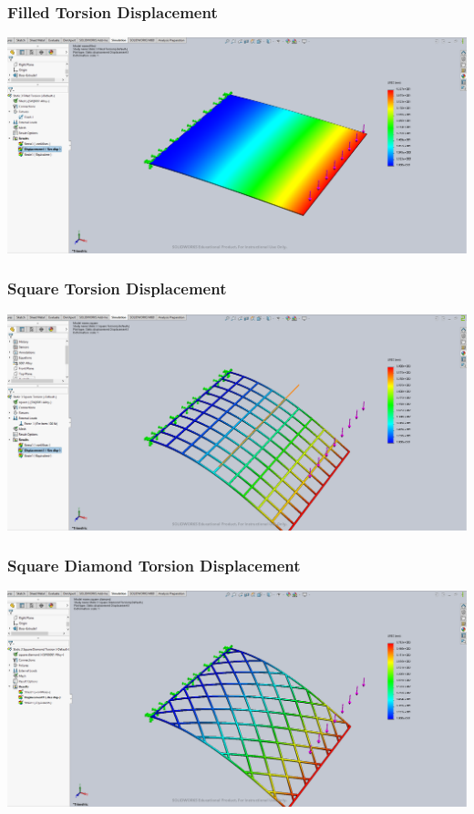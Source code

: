 \documentclass[12pt, letterpaper]{article}
\begin{document}
\begin{singlespace}
\subsubsection{Filled Torsion Displacement}
\label{ap:f-to-d}
\includegraphics[width=0.8\linewidth]{./graphs/torsion/filled-torsion-displacement}

\subsubsection{Square Torsion Displacement}
\label{ap:s-to-d}
\includegraphics[width=0.8\linewidth]{./graphs/torsion/square-torsion-displacement}

\subsubsection{Square Diamond Torsion Displacement}
\label{ap:sd-to-d}
\includegraphics[width=0.8\linewidth]{./graphs/torsion/square-diamond-torsion-displacement}


\end{singlespace}
\end{document}
